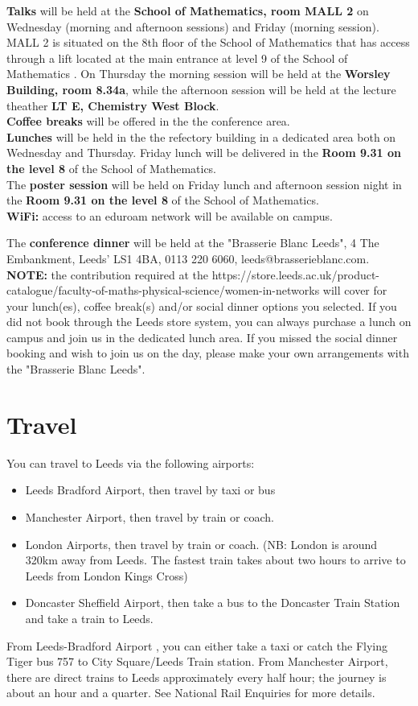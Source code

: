 \textbf{Talks} will be held at the \textbf{School of Mathematics, room MALL 2} on  Wednesday (morning and afternoon sessions) and Friday (morning session). MALL 2 is situated on the 8th floor of the School of Mathematics that has access through a lift located at the main entrance at level 9 of the School of Mathematics . 
On Thursday the morning session will be held at the \textbf{Worsley Building, room 8.34a}, while the afternoon session will be held at the lecture theather \textbf{ LT E, Chemistry West Block}.\\
\textbf{Coffee breaks} will be offered in the the conference area.\\
\textbf{Lunches} will be held in the the refectory building in a dedicated area both on Wednesday and Thursday. Friday lunch will be delivered  in the \textbf{Room 9.31 on the level 8} of the School of Mathematics.\\

The \textbf{poster session} will be held on Friday lunch and afternoon session night in the \textbf{Room 9.31 on the level 8} of the School of Mathematics. \\

\textbf{WiFi:} access to an eduroam network will be available on campus.

The \textbf{conference dinner} will be held at the "Brasserie Blanc Leeds",
4 The Embankment,
Leeds'
LS1 4BA,
0113 220 6060,
leeds@brasserieblanc.com.\\

\textbf{NOTE:} the contribution required at the https://store.leeds.ac.uk/product-catalogue/faculty-of-maths-physical-science/women-in-networks will cover for your lunch(es), coffee break(s) and/or social dinner options you selected. If you did not book through the Leeds store system, you can always purchase a lunch on campus and join us in the dedicated lunch area. If you missed the social dinner booking and wish to join us on the day, please make your own arrangements with the "Brasserie Blanc Leeds".  

\section{Travel}
You can travel to Leeds via the following airports:
\begin{itemize}
\item Leeds Bradford Airport, then travel by taxi or bus
\item Manchester Airport, then travel by train or coach.
\item London Airports, then travel by train or coach. (NB: London is around 320km away from Leeds. The fastest train takes about two hours to arrive to Leeds from London Kings Cross)
\item Doncaster Sheffield Airport, then take a bus to the Doncaster Train Station and take a train to Leeds.
\end{itemize}
From Leeds-Bradford Airport , you can either take a taxi or catch the Flying Tiger bus 757 to City Square/Leeds Train station. From Manchester Airport, there are direct trains to Leeds approximately every half hour; the journey is about an hour and a quarter. See National Rail Enquiries for more details.

